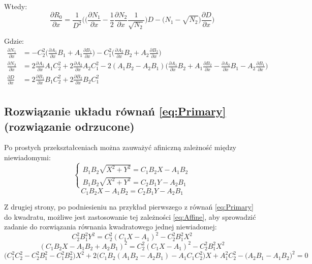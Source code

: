 \documentclass[10pt]{article}
\begin{document}
Wtedy:
\begin{equation}
\frac{\partial R_0}{\partial x} = \frac{1}{D^2}
\Bigg(
\bigg(
\frac{\partial N_1}{\partial x} -
\frac{1}{2} \frac{\partial N_2}{\partial x}
\frac{1}{\sqrt{N_2}}
\bigg)D - 
\Big( N_1-\sqrt{N_2} \Big) \frac{\partial D}{\partial x}
\Bigg)
\end{equation}

Gdzie:
\begin{equation}
\begin{split}
\frac{\partial N_1}{\partial x} &=
-C_2^2 \bigg(\frac{\partial A_1}{\partial x} B_1 + A_1 \frac{\partial B_1}{\partial x} \bigg)
-C_1^2 \bigg(\frac{\partial A_2}{\partial x} B_2 + A_2 \frac{\partial B_2}{\partial x} \bigg) \\
\frac{\partial N_2}{\partial x} &= 
2\frac{\partial A_1}{\partial x} A_1 C_2^2 + 2\frac{\partial A_2}{\partial x} A_2 C_1^2 - 
2 ( A_1B_2 - A_2B_1)
\bigg(
\frac{\partial A_1}{\partial x} B_2 + A_1 \frac{\partial B_2}{\partial x} -
\frac{\partial A_2}{\partial x} B_1 - A_2 \frac{\partial B_1}{\partial x}
\bigg) \\
\frac{\partial D}{\partial x} &=
2\frac{\partial B_1}{\partial x} B_1 C_2^2 + 2\frac{\partial B_2}{\partial x} B_2 C_1^2 \\
\end{split}
\end{equation}

\newpage
\subsection*{Rozwiązanie układu równań \eqref{eq:Primary} (rozwiązanie odrzucone)}
Po prostych przekształceniach można zauważyć afiniczną zależność między niewiadomymi:
\begin{equation}
\begin{cases}
B_1 B_2 \sqrt{X^2 + Y^2} = C_1 B_2 X - A_1 B_2 \\ 
B_1 B_2 \sqrt{X^2 + Y^2} = C_2 B_1 Y - A_2 B_1
\end{cases}
\end{equation}
\begin{equation}
C_1 B_2 X - A_1 B_2 = C_2 B_1 Y - A_2 B_1
\label{eq:Affine}
\end{equation}

Z drugiej strony, po podniesieniu na przykład pierwszego z równań \eqref{eq:Primary} do kwadratu, możliwe jest zastosowanie tej zależności \eqref{eq:Affine}, aby sprowadzić zadanie do rozwiązania równania kwadratowego jednej niewiadomej:
\begin{equation}
C_2^2 B_1^2 Y^2 = C_2^2 (C_1 X - A_1)^2 - C_2^2 B_1^2 X^2
\end{equation}
\begin{equation}
(C_1 B_2 X - A_1 B_2 + A_2 B_1)^2 = C_2^2 (C_1 X - A_1)^2 - C_2^2 B_1^2 X^2
\end{equation}
\begin{equation}
\big(C_1^2 C_2^2 - C_2^2 B_1^2 - C_1^2 B_2^2 \big) X^2 + 
2\big(C_1B_2 (A_1B_2 - A_2B_1) - A_1C_1C_2^2 \big) X +
A_1^2 C_2^2 - \big(A_2B_1 - A_1B_2 \big)^2
 = 0
\end{equation}
\end{document}
